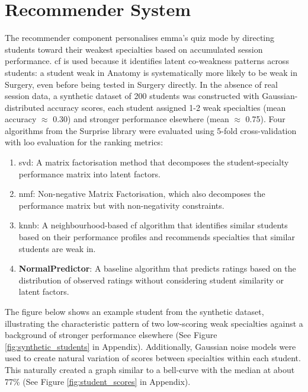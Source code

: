 \chapter{Recommender System}
\label{ch:crs}

The recommender component personalises \gls{emma}'s quiz mode by directing students toward their weakest specialties based on accumulated session performance. \gls{cf} is used because it identifies latent co-weakness patterns across students: a student weak in Anatomy is systematically more likely to be weak in Surgery, even before being tested in Surgery directly. In the absence of real session data, a synthetic dataset of 200 students was constructed with Gaussian-distributed accuracy scores, each student assigned 1-2 weak specialties (mean accuracy $\approx$ 0.30) and stronger performance elsewhere (mean $\approx$ 0.75). Four algorithms from the Surprise library \cite{hug_surprise_2020} were evaluated using 5-fold cross-validation with \gls{loo} evaluation for the ranking metrics: 

\begin{enumerate}
    \item \gls{svd}: A matrix factorisation method that decomposes the student-specialty performance matrix into latent factors.
    \item \gls{nmf}: Non-negative Matrix Factorisation, which also decomposes the performance matrix but with non-negativity constraints.
    \item \gls{knnb}: A neighbourhood-based \gls{cf} algorithm that identifies similar students based on their performance profiles and recommends specialties that similar students are weak in.
    \item \textbf{NormalPredictor}: A baseline algorithm that predicts ratings based on the distribution of observed ratings without considering student similarity or latent factors.
\end{enumerate}

The figure below shows an example student from the synthetic dataset, illustrating the characteristic pattern of two low-scoring weak specialties against a background of stronger performance elsewhere (See Figure \ref{fig:synthetic_students} in Appendix). Additionally, Gaussian noise models were used to create natural variation of scores between specialties within each student. This naturally created a graph similar to a bell-curve with the median at about 77\% (See Figure \ref{fig:student_scores} in Appendix).


